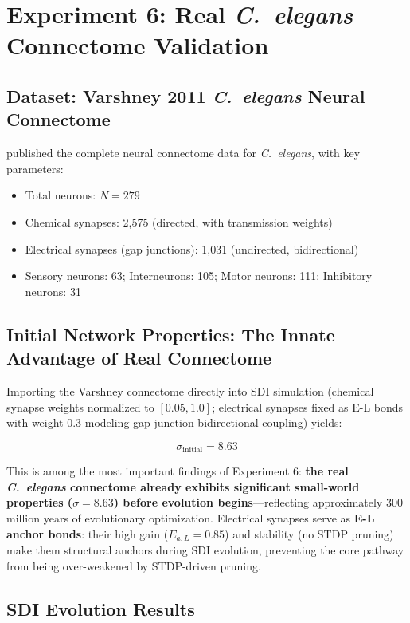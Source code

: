\documentclass[12pt,a4paper]{article}
\begin{document}
\section{Experiment 6: Real \textit{C.\ elegans} Connectome Validation}

\subsection{Dataset: Varshney 2011 \textit{C.\ elegans} Neural Connectome}

\citet{varshney2011} published the complete neural connectome data for \textit{C.\ elegans}, with key parameters:
\begin{itemize}
\item Total neurons: $N = 279$
\item Chemical synapses: 2,575 (directed, with transmission weights)
\item Electrical synapses (gap junctions): 1,031 (undirected, bidirectional)
\item Sensory neurons: 63; Interneurons: 105; Motor neurons: 111; Inhibitory neurons: 31
\end{itemize}

\subsection{Initial Network Properties: The Innate Advantage of Real Connectome}

Importing the Varshney connectome directly into SDI simulation (chemical synapse weights normalized to $[0.05, 1.0]$; electrical synapses fixed as E-L bonds with weight 0.3 modeling gap junction bidirectional coupling) yields:

$$\sigma_{\text{initial}} = 8.63$$

This is among the most important findings of Experiment 6: \textbf{the real \textit{C.\ elegans} connectome already exhibits significant small-world properties ($\sigma=8.63$) before evolution begins}---reflecting approximately 300 million years of evolutionary optimization. Electrical synapses serve as \textbf{E-L anchor bonds}: their high gain ($E_{a,L}=0.85$) and stability (no STDP pruning) make them structural anchors during SDI evolution, preventing the core pathway from being over-weakened by STDP-driven pruning.

\subsection{SDI Evolution Results}
\end{document}
